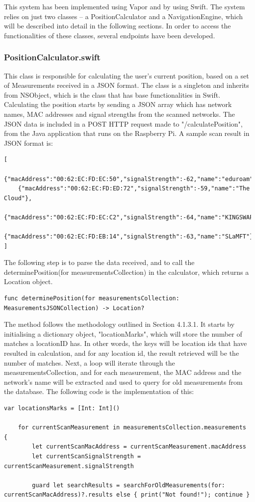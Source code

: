 This system has been implemented using Vapor and by using Swift. The system relies on just two classes – a PositionCalculator and a NavigationEngine, which will be described into detail in the following sections. In order to access the functionalities of these classes, several endpoints have been developed.

\subsubsection*{PositionCalculator.swift}
This class is responsible for calculating the user's current position, based on a set of Measurements received in a JSON format. The class is a singleton and inherits from NSObject, which is the class that has base functionalities in Swift.
Calculating the position starts by sending a JSON array which has network names, MAC addresses and signal strengths from the scanned networks. The JSON data is included in a  POST HTTP request made to "/calculatePosition", from the Java application that runs on the Raspberry Pi. A sample scan result in JSON format is: 
\begin{lstlisting}
[
    {"macAddress":"00:62:EC:FD:EC:50","signalStrength":-62,"name":"eduroam"},
    {"macAddress":"00:62:EC:FD:ED:72","signalStrength":-59,"name":"The Cloud"},
    {"macAddress":"00:62:EC:FD:EC:C2","signalStrength":-64,"name":"KINGSWAP"},
    {"macAddress":"00:62:EC:FD:EB:14","signalStrength":-63,"name":"SLaMFT"}
]
\end{lstlisting}

The following step is to parse the data received, and to call the determinePosition(for measurementsCollection) in the calculator, which returns a Location object. 
\begin{lstlisting}
func determinePosition(for measurementsCollection: MeasurementsJSONCollection) -> Location?
\end{lstlisting}

The method follows the methodology outlined in Section 4.1.3.1. It starts by initialising a dictionary object, "locationMarks", which will store the number of matches a locationID has. In other words, the keys will be location ids that have resulted in calculation, and for any location id, the result retrieved will be the number of matches. Next, a loop will iterate through the measurementsCollection, and for each measurement, the MAC address and the network's name will be extracted and used to query for old measurements from the database. The following code is the implementation of this:
\begin{lstlisting}
var locationsMarks = [Int: Int]()

    for currentScanMeasurement in measurementsCollection.measurements {
        let currentScanMacAddress = currentScanMeasurement.macAddress
        let currentScanSignalStrength = currentScanMeasurement.signalStrength

        guard let searchResults = searchForOldMeasurements(for: currentScanMacAddress)?.results else { print("Not found!"); continue }
\end{lstlisting}


